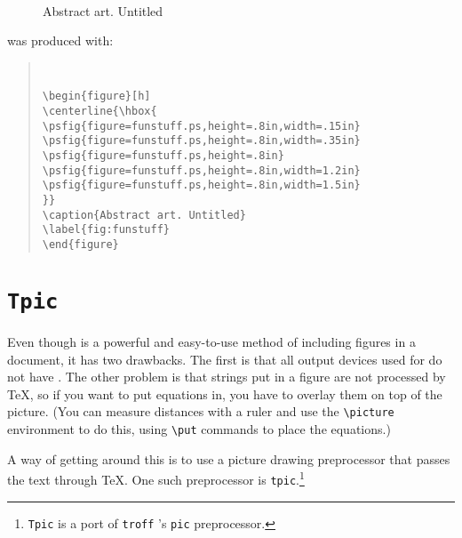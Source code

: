 \begin{figure}[h]
\centerline{\hbox{
}}
\caption{Abstract art. Untitled}
\label{fig:funstuff}
\end{figure}

was produced with:

\begin{quote}
\tt
\begin{verbatim}
\begin{figure}[h]
\centerline{\hbox{
\psfig{figure=funstuff.ps,height=.8in,width=.15in}
\psfig{figure=funstuff.ps,height=.8in,width=.35in}
\psfig{figure=funstuff.ps,height=.8in}
\psfig{figure=funstuff.ps,height=.8in,width=1.2in}
\psfig{figure=funstuff.ps,height=.8in,width=1.5in}
}}
\caption{Abstract art. Untitled}
\label{fig:funstuff}
\end{figure}
\end{verbatim}
\end{quote}

\section{\tt Tpic}

Even though \psfigtex is a powerful and easy-to-use method of
including \postscript figures in a document, it has two drawbacks. The
first is that all output devices used for \tex do not have
\Ps. The other problem is that strings put in a
\postscript figure are not processed by \TeX, so if you want to put
equations in, you have to overlay them on top of the picture.
(You can measure distances with a ruler and use the {\tt\verb+\picture+} 
environment to do this, using {\tt \verb+\put+} commands to place the 
equations.)

A way of getting around this is to use a picture drawing preprocessor that
passes the text through \TeX. One such preprocessor is {\tt tpic}.\footnote{
{\tt Tpic} is a port of {\tt troff} 's {\tt pic} preprocessor.}

